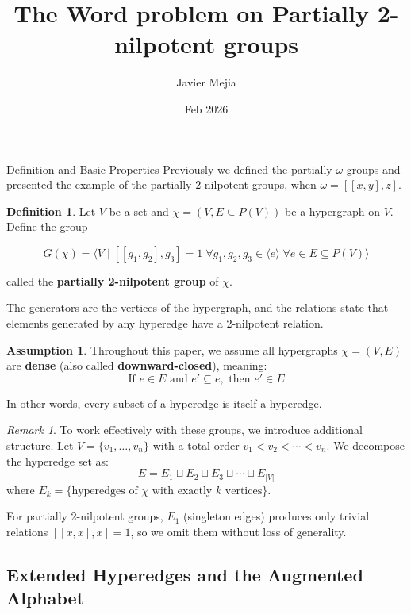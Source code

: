 \documentclass{article}
\title{The Word problem on Partially 2-nilpotent
groups}
\author{Javier Mejia}
\date{Feb 2026}
\theoremstyle{definition}
\newtheorem{definition}[theorem]{Definition}
\theoremstyle{remark}
\newtheorem{remark}[theorem]{Remark}
\theoremstyle{theorem}
\theoremstyle{definition}
\newtheorem{assumption}[theorem]{Assumption}
\begin{document}
    
\maketitle

\begin{section}{Definition and Basic Properties}
    Previously we defined the partially $\omega$ groups and presented the example of the partially 2-nilpotent groups, when $\omega = [[x,y],z]$.

\begin{definition}
    Let $V$ be a set and $\chi=(V,E\subseteq P(V))$ be a hypergraph on $V$. Define the group

   $$G(\chi)=\langle V \mid [[g_1,g_2],g_3]=1\;\forall g_1,g_2,g_3\in \langle e\rangle \;\forall e\in E\subseteq P(V) \rangle$$

    called the \textbf{partially 2-nilpotent group} of $\chi$.
\end{definition}

The generators are the vertices of the hypergraph, and the relations state
that elements generated by any hyperedge have a 2-nilpotent relation.

\begin{assumption}\label{assump:dense}
Throughout this paper, we assume all hypergraphs $\chi = (V, E)$ are \textbf{dense} (also called \textbf{downward-closed}), meaning:
$$\text{If } e \in E \text{ and } e' \subseteq e , \text{ then } e' \in E$$

In other words, every subset of a hyperedge is itself a hyperedge.
\end{assumption}

\begin{remark}
To work effectively with these groups, we introduce additional structure. Let $V = \{v_1, \ldots, v_n\}$ with a total order $v_1 < v_2 < \cdots < v_n$. We decompose the hyperedge set as:
$$E = E_1\sqcup E_2 \sqcup E_3\sqcup \cdots \sqcup E_{|V|}$$ 
where $E_k=\{\text{hyperedges of }\chi \text{ with exactly }k \text{ vertices} \}$.
\end{remark}

For partially 2-nilpotent groups, $E_1$ (singleton edges) produces only trivial relations $[[x,x],x]=1$, so we omit them without loss of generality.

\subsection{Extended Hyperedges and the Augmented Alphabet}


\end{section}
\end{document}
